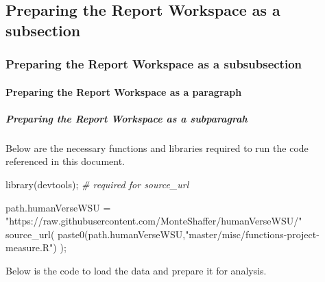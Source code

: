 \documentclass[]{article}
\newenvironment{Shaded}{\begin{snugshade}}{\end{snugshade}}
\newcommand{\CommentTok}[1]{\textcolor[rgb]{0.56,0.35,0.01}{\textit{#1}}}
\newcommand{\FunctionTok}[1]{\textcolor[rgb]{0.00,0.00,0.00}{#1}}
\newcommand{\NormalTok}[1]{#1}
\newcommand{\OtherTok}[1]{\textcolor[rgb]{0.56,0.35,0.01}{#1}}
\newcommand{\StringTok}[1]{\textcolor[rgb]{0.31,0.60,0.02}{#1}}
\begin{document}
\newpage

\subsection{Preparing the Report Workspace as a subsection}
\label{sec:appendix-setup}

\subsubsection{Preparing the Report Workspace as a subsubsection}
\label{sec:appendix-setup2}

\paragraph{Preparing the Report Workspace as a paragraph}
\label{sec:appendix-setup3}

\subparagraph{Preparing the Report Workspace as a subparagrah}
\label{sec:appendix-setup4}

Below are the necessary functions and libraries required to run the code
referenced in this document.

\begin{Shaded}
\begin{Highlighting}[]
\FunctionTok{library}\NormalTok{(devtools);       }\CommentTok{\# required for source\_url}

\NormalTok{path.humanVerseWSU }\OtherTok{=} \StringTok{"https://raw.githubusercontent.com/MonteShaffer/humanVerseWSU/"}
\FunctionTok{source\_url}\NormalTok{( }\FunctionTok{paste0}\NormalTok{(path.humanVerseWSU,}\StringTok{"master/misc/functions{-}project{-}measure.R"}\NormalTok{) );}
\end{Highlighting}
\end{Shaded}

Below is the code to load the data and prepare it for analysis.
\end{document}
